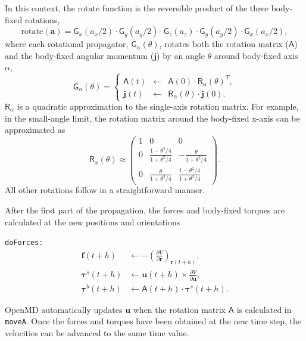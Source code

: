 \documentclass[letterpaper]{report}
\begin{document}
In this context, the $\mathrm{rotate}$ function is the reversible product
of the three body-fixed rotations,
\begin{equation}
\mathrm{rotate}(\mathbf{a}) = \mathsf{G}_x(a_x / 2) \cdot
\mathsf{G}_y(a_y / 2) \cdot \mathsf{G}_z(a_z) \cdot \mathsf{G}_y(a_y /
2) \cdot \mathsf{G}_x(a_x /2),
\end{equation}
where each rotational propagator, $\mathsf{G}_\alpha(\theta)$, rotates
both the rotation matrix ($\mathsf{A}$) and the body-fixed angular
momentum ($\mathbf{j}$) by an angle $\theta$ around body-fixed axis
$\alpha$,
\begin{equation}
\mathsf{G}_\alpha( \theta ) = \left\{
\begin{array}{lcl}
\mathsf{A}(t) & \leftarrow & \mathsf{A}(0) \cdot \mathsf{R}_\alpha(\theta)^T, \\
\mathbf{j}(t) & \leftarrow & \mathsf{R}_\alpha(\theta) \cdot \mathbf{j}(0).
\end{array}
\right.
\end{equation}
$\mathsf{R}_\alpha$ is a quadratic approximation to
the single-axis rotation matrix.  For example, in the small-angle
limit, the rotation matrix around the body-fixed x-axis can be
approximated as
\begin{equation}
\mathsf{R}_x(\theta) \approx \left(
\begin{array}{ccc}
1 & 0 & 0 \\
0 & \frac{1-\theta^2 / 4}{1 + \theta^2 / 4}  & -\frac{\theta}{1+
\theta^2 / 4} \\
0 & \frac{\theta}{1+
\theta^2 / 4} & \frac{1-\theta^2 / 4}{1 + \theta^2 / 4}
\end{array}
\right).
\end{equation}
All other rotations follow in a straightforward manner.

After the first part of the propagation, the forces and body-fixed
torques are calculated at the new positions and orientations

{\tt doForces:}
\begin{align*}
\mathbf{f}(t + h) &\leftarrow  
	- \left(\frac{\partial V}{\partial \mathbf{r}}\right)_{\mathbf{r}(t + h)}, \\
%
\mathbf{\tau}^{s}(t + h) &\leftarrow \mathbf{u}(t + h)
	\times \frac{\partial V}{\partial \mathbf{u}}, \\
%
\mathbf{\tau}^{b}(t + h) &\leftarrow \mathsf{A}(t + h)
	\cdot \mathbf{\tau}^s(t + h).
\end{align*}

OpenMD automatically updates $\mathbf{u}$ when the rotation matrix
$\mathsf{A}$ is calculated in {\tt moveA}.  Once the forces and
torques have been obtained at the new time step, the velocities can be
advanced to the same time value.
\end{document}
